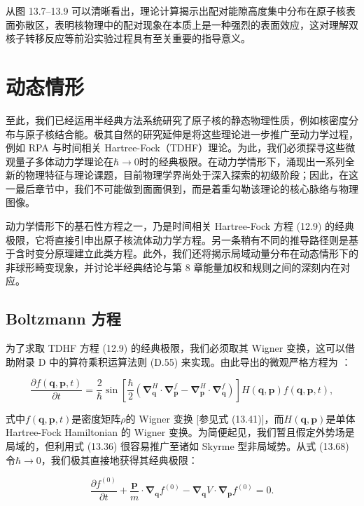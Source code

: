 从图 13.7–13.9 可以清晰看出，理论计算揭示出配对能隙高度集中分布在原子核表面弥散区，表明核物理中的配对现象在本质上是一种强烈的表面效应，这对理解双核子转移反应等前沿实验过程具有至关重要的指导意义。

\section{动态情形\label{sec:13.3_=0052A8=006001=0060C5=005F62}}

至此，我们已经运用半经典方法系统研究了原子核的静态物理性质，例如核密度分布与原子核结合能。极其自然的研究延伸是将这些理论进一步推广至动力学过程，例如
RPA 与时间相关 Hartree-Fock（TDHF）理论。为此，我们必须探寻这些微观量子多体动力学理论在$\hbar\to0$时的经典极限。在动力学情形下，涌现出一系列全新的物理特征与理论课题，目前物理学界尚处于深入探索的初级阶段；因此，在这一最后章节中，我们不可能做到面面俱到，而是着重勾勒该理论的核心脉络与物理图像。

动力学情形下的基石性方程之一，乃是时间相关 Hartree-Fock 方程 (12.9) 的经典极限，它将直接引申出原子核流体动力学方程。另一条稍有不同的推导路径则是基于含时变分原理建立此类方程。此外，我们还将揭示局域动量分布在动态情形下的非球形畸变现象，并讨论半经典结论与第
8 章能量加权和规则之间的深刻内在对应。

\subsection{Boltzmann 方程\label{subsec:13.3.1_Boltzmann=0065B9=007A0B}}

为了求取 TDHF 方程 (12.9) 的经典极限，我们必须取其 Wigner 变换，这可以借助附录 D 中的算符乘积运算法则 (D.55)
来实现。由此导出的微观严格方程为 \cite{Gr46,KK76}：

\[
\frac{\partial f(\boldsymbol{q},\boldsymbol{p},t)}{\partial t}=\frac{2}{\hbar}\sin\left[\frac{\hbar}{2}\left(\boldsymbol{\nabla}^{H}_{\boldsymbol{q}}\cdot\boldsymbol{\nabla}^{f}_{\boldsymbol{p}}-\boldsymbol{\nabla}^{H}_{\boldsymbol{p}}\cdot\boldsymbol{\nabla}^{f}_{\boldsymbol{q}}\right)\right]H(\boldsymbol{q},\boldsymbol{p})f(\boldsymbol{q},\boldsymbol{p},t),
\]

式中$f(\boldsymbol{q},\boldsymbol{p},t)$是密度矩阵$\rho$的 Wigner 变换 {[}参见式
(13.41){]}，而$H(\boldsymbol{q},\boldsymbol{p})$是单体 Hartree-Fock Hamiltonian
的 Wigner 变换。为简便起见，我们暂且假定外势场是局域的，但利用式 (13.36) 很容易推广至诸如 Skyrme 型非局域势。从式
(13.68) 令$\hbar\to0$，我们极其直接地获得其经典极限：

\[
\frac{\partial f^{(0)}}{\partial t}+\frac{\boldsymbol{p}}{m}\cdot\boldsymbol{\nabla}_{\boldsymbol{q}}f^{(0)}-\boldsymbol{\nabla}_{\boldsymbol{q}}V\cdot\boldsymbol{\nabla}_{\boldsymbol{p}}f^{(0)}=0.
\]

